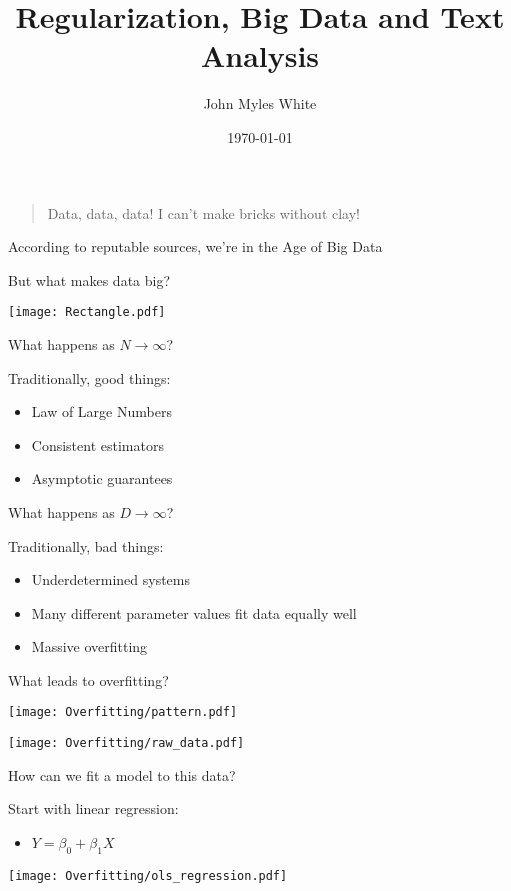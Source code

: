 \documentclass[xcolor=pdftex,dvipsnames,table]{beamer}
\title{Regularization, Big Data and Text Analysis}
\author{John Myles White}
\date{\today}
\begin{document}
\frame{\titlepage}

\frame
{
	\begin{quote}
Data, data, data! I can't make bricks without clay!
	\end{quote}
}

\frame
{
	According to reputable sources, we're in the Age of Big Data
}

\frame
{
	But what makes data big?
}

\frame
{
	\begin{center}
		\texttt{[image: Rectangle.pdf]}
	\end{center}
}

\frame
{
	What happens as $N \to \infty$?
}

\frame
{
	Traditionally, good things:
	\begin{itemize}
		\item{Law of Large Numbers}
		\item{Consistent estimators}
		\item{Asymptotic guarantees}
	\end{itemize}
}

\frame
{
	What happens as $D \to \infty$?
}

\frame
{
	Traditionally, bad things:
	\begin{itemize}
		\item{Underdetermined systems}
		\item{Many different parameter values fit data equally well}
		\item{Massive overfitting}
	\end{itemize}
}

\frame
{
	What leads to overfitting?
}

\frame
{
	\begin{center}
		\texttt{[image: Overfitting/pattern.pdf]}
	\end{center}
}

\frame
{
	\begin{center}
		\texttt{[image: Overfitting/raw\_data.pdf]}
	\end{center}
}

\frame
{
	How can we fit a model to this data?
}

\frame
{
	Start with linear regression:
	\begin{itemize}
		\item{$Y = \beta_{0} + \beta_{1} X$}
	\end{itemize}
}

\frame
{
	\begin{center}
		\texttt{[image: Overfitting/ols\_regression.pdf]}
	\end{center}
}
\end{document}
